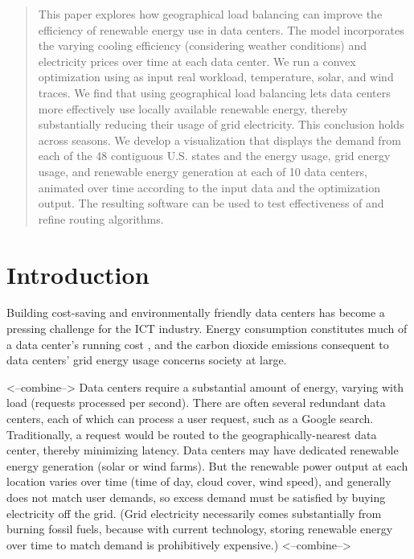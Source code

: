\documentclass{acm_proc_article-sp}
\begin{document}
\maketitle
\begin{abstract}
This paper explores how geographical load balancing can improve the efficiency of renewable energy use in data centers.
The model incorporates the varying cooling efficiency (considering weather conditions) and electricity prices over time at each data center.
We run a convex optimization using as input real workload, temperature, solar, and wind traces.
We find that using geographical load balancing lets data centers more effectively use locally available renewable energy, thereby substantially reducing their usage of grid electricity. This conclusion holds across seasons.
We develop a visualization that displays the demand from each of the 48 contiguous U.S. states and the energy usage, grid energy usage, and renewable energy generation at each of 10 data centers, animated over time according to the input data and the optimization output. The resulting software can be used to test effectiveness of and refine routing algorithms.


\end{abstract}

\section{Introduction}
Building cost-saving and environmentally friendly data centers has become a pressing challenge for the ICT industry.
Energy consumption constitutes much of a data center’s running cost \cite{datacenter}, and the carbon dioxide emissions consequent to data centers’ grid energy usage concerns society at large.

<--combine-->
Data centers require a substantial amount of energy, varying with load (requests processed per second). There are often several redundant data centers, each of which can process a user request, such as a Google search. Traditionally, a request would be routed to the geographically-nearest data center, thereby minimizing latency. Data centers may have dedicated renewable energy generation (solar or wind farms). But the renewable power output at each location varies over time (time of day, cloud cover, wind speed), and generally does not match user demands, so excess demand must be satisfied by buying electricity off the grid. (Grid electricity necessarily comes substantially from burning fossil fuels, because with current technology, storing renewable energy over time to match demand is prohibitively expensive.)
<--combine-->
\end{document}
